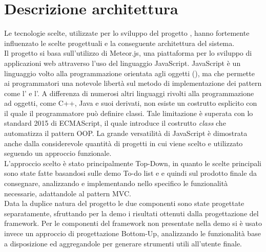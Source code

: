 \section{Descrizione architettura}
Le tecnologie scelte, utilizzate per lo sviluppo del progetto \ProjectName{}, hanno fortemente influenzato le scelte progettuali e la conseguente architettura del sistema.\\

Il progetto si basa sull'utilizzo di Meteor.js, una piattaforma per lo sviluppo di applicazioni web attraverso l'uso del linguaggio JavaScript. JavaScript è un linguaggio volto alla programmazione orientata agli oggetti (), ma che permette ai programmatori una notevole libertà sul metodo di implementazione dei pattern come l' e l'. A differenza di numerosi altri linguaggi rivolti alla programmazione ad oggetti, come C++, Java e suoi derivati, non esiste un costrutto esplicito con il quale il programmatore può definire classi. Tale limitazione è superata con lo standard 2015 di ECMAScript, il quale introduce il costrutto \textit{class} che automatizza il pattern OOP. La grande versatilità di JavaScript è dimostrata anche dalla considerevole quantità di progetti in cui viene scelto e utilizzato seguendo un approccio funzionale.\\

L'approccio scelto è stato principalmente Top-Down, in quanto le scelte principali sono state fatte basandosi sulle demo To-do list e \DemoName{} e quindi sul prodotto finale da consegnare, analizzando e implementando nello specifico le funzionalità necessarie, adattandole al pattern MVC.\\

Data la duplice natura del progetto le due componenti sono state progettate separatamente, sfruttando per la demo i risultati ottenuti dalla progettazione del framework. Per le componenti del framework non presentate nella demo si è usato invece un approccio di progettazione Bottom-Up, analizzando le funzionalità base a disposizione ed aggregandole per generare strumenti utili all'utente finale.